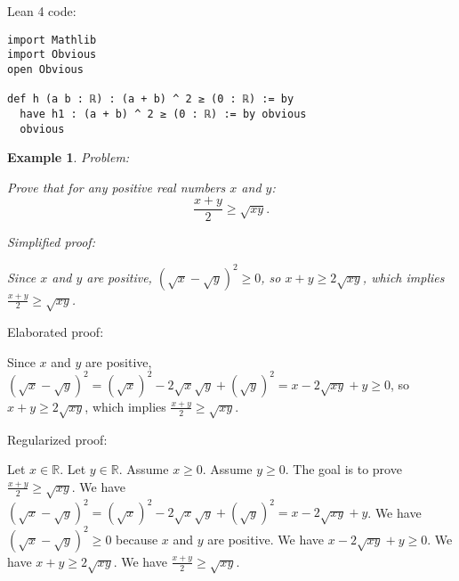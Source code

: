 \documentclass{article}
\newtheorem{example}{Example}
\begin{document}
Lean 4 code:
\begin{tcolorbox}[colback=white!10, width=\linewidth]
\begin{lstlisting}[language=Lean4]
import Mathlib
import Obvious
open Obvious

def h (a b : ℝ) : (a + b) ^ 2 ≥ (0 : ℝ) := by
  have h1 : (a + b) ^ 2 ≥ (0 : ℝ) := by obvious
  obvious

\end{lstlisting}
\end{tcolorbox}


\begin{example}
Problem:
\begin{tcolorbox}[colback=yellow!10, width=\linewidth]
Prove that for any positive real numbers $x$ and $y$:
    $$\frac{x+y}{2} \geq \sqrt{xy}.$$
\end{tcolorbox}

Simplified proof:
\begin{tcolorbox}[colback=blue!10, width=\linewidth]
Since $x$ and $y$ are positive, $(\sqrt x - \sqrt y)^2 \ge 0$, so $x+y \ge 2\sqrt{xy}$, which implies $\frac{x+y}{2} \ge \sqrt{xy}$.
\end{tcolorbox}
\end{example}

Elaborated proof:
\begin{tcolorbox}[colback=green!10, width=\linewidth]
Since $x$ and $y$ are positive, $(\sqrt x - \sqrt y)^2 = (\sqrt{x})^2 - 2\sqrt{x}\sqrt{y} + (\sqrt{y})^2= x - 2\sqrt{xy} + y \ge 0$, so $x+y \ge 2\sqrt{xy}$, which implies $\frac{x+y}{2} \ge \sqrt{xy}$.
\end{tcolorbox}

Regularized proof:
\begin{tcolorbox}[colback=red!10, width=\linewidth]
Let $x\in\mathbb{R}$. Let $y\in\mathbb{R}$.
Assume $x \ge 0$. Assume $y \ge 0$.
The goal is to prove $\frac{x+y}{2} \ge \sqrt{xy}$.
We have ${{(\sqrt x - \sqrt y)}}^2 = {{(\sqrt{x})}}^2 - 2\sqrt{x}\sqrt{y} + {{(\sqrt{y})}}^2= x - 2\sqrt{xy} + y$.
We have ${{(\sqrt x - \sqrt y)}}^2 \ge 0$ because $x$ and $y$ are positive.
We have $x - 2\sqrt{xy} + y \ge 0$.
We have $x+y \ge 2\sqrt{xy}$.
We have $\frac{x+y}{2} \ge \sqrt{xy}$.
\end{tcolorbox}
\end{document}
